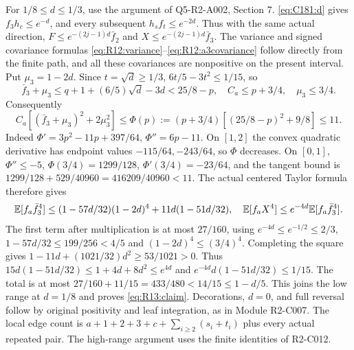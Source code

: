 For $1/8\le d\le1/3$, use the argument of
Q5-R2-A002, Section 7.
\eqref{eq:C181:d} gives $f_3h_c\le e^{-d}$, and every subsequent
$h_sf_t\le e^{-2d}$. Thus with the same actual direction,
$F\le e^{-(2j-1)d}\bar f_2$ and
$X\le e^{-(2j-1)d}\bar f_3$.
The variance and signed covariance formulas
\eqref{eq:R12:variance}--\eqref{eq:R12:a3covariance} follow directly
from the finite path, and all these covariances are nonpositive on
the present interval. Put $\mu_3=1-2d$.
Since $t=\sqrt d\ge1/3$, $6t/5-3t^2\le1/15$, so
\[
\bar f_3+\mu_3\le q+1+(6/5)\sqrt d-3d<25/8-p,
\quad C_a\le p+3/4,\quad\mu_3\le3/4.
\]
Consequently
\[
C_a[(\bar f_3+\mu_3)^2+2\mu_3^2]
\le\Phi(p):=(p+3/4)[(25/8-p)^2+9/8]\le11.
\]
Indeed $\Phi'=3p^2-11p+397/64$, $\Phi''=6p-11$.
On $[1,2]$ the convex quadratic derivative has endpoint values
$-115/64,-243/64$, so $\Phi$ decreases. On $[0,1]$,
$\Phi''\le-5$, $\Phi(3/4)=1299/128$,
$\Phi'(3/4)=-23/64$, and the tangent bound is
$1299/128+529/40960=416209/40960<11$.
The actual centered Taylor formula therefore gives
\[
\mathbb E[f_a\bar f_3^4]\le(1-57d/32)(1-2d)^4
+11d(1-51d/32),\quad
\mathbb E[f_aX^4]\le e^{-4d}\mathbb E[f_a\bar f_3^4].
\]
The first term after multiplication is at most $27/160$, using
$e^{-4d}\le e^{-1/2}\le2/3$,
$1-57d/32\le199/256<4/5$ and $(1-2d)^4\le(3/4)^4$.
Completing the square gives
$1-11d+(1021/32)d^2\ge53/1021>0$.
Thus $15d(1-51d/32)\le1+4d+8d^2\le e^{4d}$ and
$e^{-4d}d(1-51d/32)\le1/15$.
The total is at most $27/160+11/15=433/480<14/15\le1-d/5$.
This joins the low range at $d=1/8$ and proves \eqref{eq:R13:claim}.
Decorations, $d=0$, and full reversal follow by original positivity
and leaf integration, as in Module R2-C007. The local edge count is
$a+1+2+3+c+\sum_{i\ge2}(s_i+t_i)$ plus every actual repeated pair.
The high-range argument uses the finite identities of R2-C012.

